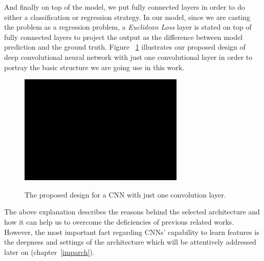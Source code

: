 And finally on top of the model, we put fully connected layers in order to do either a classification or regression strategy. In our model, since we are casting the problem as a regression problem, a \textit{Euclidean Loss} layer is stated on top of fully connected layers to project the output as the difference between model prediction and the ground truth. Figure ~\ref{fig:proposenet} illustrates our proposed design of deep convolutional neural network with just one convolutional layer in order to portray the basic structure we are going use in this work. 

\begin{figure}[H]
	\centering
	{\includegraphics[width=0.7\textwidth]{images/1}}
	\caption{The proposed design for a CNN with just one convolution layer.}
	\label{fig:proposenet}
\end{figure}

The above explanation describes the reasons behind the selected architecture and how it can help us to overcome the deficiencies of previous related works. However, the most important fact regarding CNNs' capability to learn features is the deepness and settings of the architecture which will be attentively addressed later on (chapter~\ref{imparch}).  